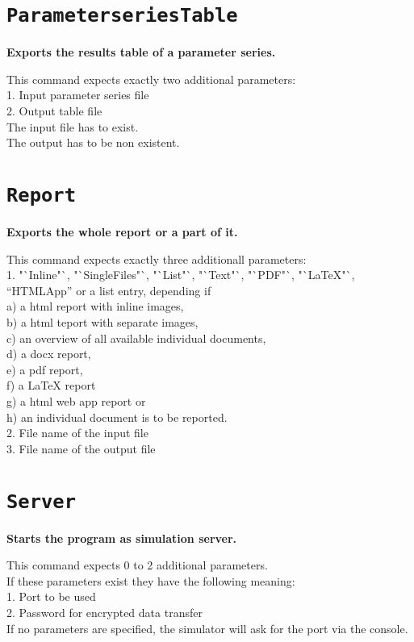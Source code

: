 \section{\texttt{ParameterseriesTable}}

\textbf{Exports the results table of a parameter series.}

This command expects exactly two additional parameters:\\
1. Input parameter series file\\
2. Output table file\\
The input file has to exist.\\
The output has to be non existent.

\section{\texttt{Report}}

\textbf{Exports the whole report or a part of it.}

This command expects exactly three additionall parameters:\\
1. "`Inline"`, "`SingleFiles"`, "`List"`, "`Text"`, "`PDF"`, "`LaTeX"`, "`HTMLApp"' or a list entry, depending if\\
a) a html report with inline images,\\
b) a html teport with separate images,\\
c) an overview of all available individual documents,\\
d) a docx report,\\
e) a pdf report,\\
f) a LaTeX report\\
g) a html web app report or\\
h) an individual document is to be reported.\\
2. File name of the input file\\
3. File name of the output file

\section{\texttt{Server}}

\textbf{Starts the program as simulation server.}

This command expects 0 to 2 additional parameters.\\
If these parameters exist they have the following meaning:\\
1. Port to be used\\
2. Password for encrypted data transfer\\
If no parameters are specified, the simulator will ask for the port via the console.

